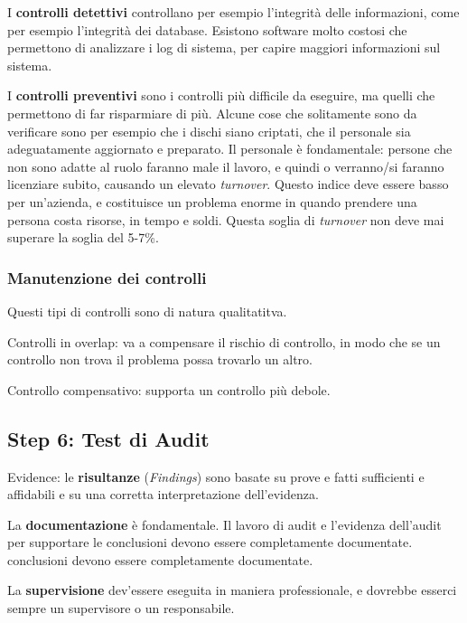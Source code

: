 I \textbf{controlli detettivi} controllano per esempio l'integrità delle 
informazioni, come per esempio l'integrità dei database. Esistono software molto 
costosi che permettono di analizzare i log di sistema, per capire maggiori 
informazioni sul sistema.

I \textbf{controlli preventivi} sono i controlli più difficile da eseguire, ma 
quelli che permettono di far risparmiare di più. Alcune cose che solitamente 
sono da verificare sono per esempio che i dischi siano criptati, che il 
personale sia adeguatamente aggiornato e preparato.
Il personale è fondamentale: persone che non sono adatte al ruolo faranno male 
il lavoro, e quindi o verranno/si faranno licenziare subito, causando un elevato 
\textit{turnover}. Questo indice deve essere basso per un'azienda, e costituisce 
un problema enorme in quando prendere una persona costa risorse, in tempo e 
soldi. Questa soglia di \textit{turnover} non deve mai superare la soglia del 
5-7\%.

\subsubsection{Manutenzione dei controlli}
Questi tipi di controlli sono di natura qualitatitva.

Controlli in overlap: va a compensare il rischio di controllo, in modo che se un 
controllo non trova il problema possa trovarlo un altro.

Controllo compensativo: supporta un controllo più debole.



\subsection{Step 6: Test di Audit}


Evidence: le \textbf{risultanze} (\emph{Findings}) sono basate su prove e fatti 
sufficienti e affidabili e su una corretta interpretazione dell'evidenza. 

La \textbf{documentazione} è fondamentale. Il lavoro di audit e l'evidenza 
dell'audit per supportare le conclusioni devono essere completamente 
documentate.
conclusioni devono essere completamente documentate. 

La \textbf{supervisione} dev'essere eseguita in maniera professionale, e 
dovrebbe esserci sempre un supervisore o un responsabile.

